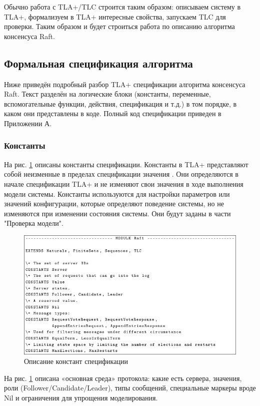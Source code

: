 Обычно работа с TLA+/TLC строится таким образом: описываем систему в TLA+,
формализуем в TLA+ интересные свойства, запускаем TLC для проверки. Таким
образом и будет строиться работа по описанию алгоритма консенсуса Raft.

\subsection{Формальная спецификация алгоритма}

Ниже приведён подробный разбор TLA+ спецификации алгоритма консенсуса Raft.
Текст разделён на логические блоки (константы, переменные, вспомогательные
функции, действия, спецификация и т.д.) в том порядке, в каком они
представлены в коде. Полный код спецификации приведен в Приложении А.

\subsubsection*{Константы}

На рис. \ref{fig:tla-01} описаны константы спецификации. Константы в TLA+
представляют собой неизменные в пределах спецификации значения . Они определяются
в начале спецификации TLA+ и не изменяют свои значения в ходе выполнения модели
системы. Константы используются для настройки параметров или значений
конфигурации, которые определяют поведение системы, но не изменяются при
изменении состояния системы. Они будут заданы в части "Проверка модели".

\begin{figure}
  \centering
  \includegraphics[scale=0.6]{inc/tla-01.png}
  \caption{Описание констант спецификации}
  \label{fig:tla-01}
\end{figure}

На рис. \ref{fig:tla-01} описана «основная среда» протокола: какие есть сервера,
значения, роли (Follower/Candidate/Leader), типы сообщений, специальные маркеры
вроде Nil и ограничения для упрощения моделирования.

